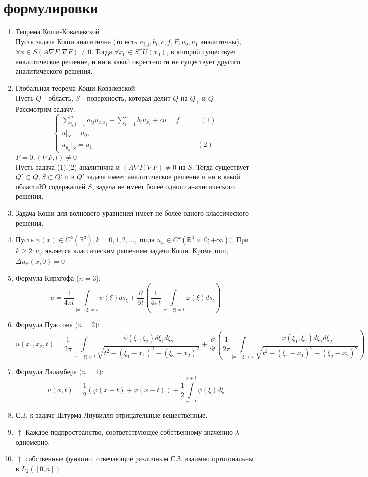 \documentclass[a4paper,12pt]{article}
\newcommand {\pp} {\partial}
\newcommand {\FI} {\varphi}
\newcommand {\iii} {\int\limits}
\newcommand {\LS} {\sum\limits}
\begin{document}
\newpage
\section{формулировки}

\begin{enumerate}
\item Теорема Коши-Ковалевской\\
Пусть задача Коши аналитична (то есть $a_{i,j}, b_i, c, f, F, u_0, u_1$  аналитичны), $\forall x \in S (A\nabla F, \nabla F) \ne 0$. Тогда $\forall x_0\in S \exists U(x_0)$, в которой существует аналитическое решение, и ни в какой окрестности не существует другого аналитического решения.


\item Глобальная теорема Коши-Ковалевской\\
Пусть $Q$ - область, $S$ - поверхность, которая делит $Q$ на $Q_+$ и $Q_-$ Рассмотрим задачу:\\
\begin{equation*}
 \begin{cases}
   \LS_{i,j=1}^n a_{ij} u_{x_ix_j} + \LS_{i=1}^n b_i u_{x_i}+cu=f \quad\quad\quad(1)
   \\
	u|_S = u_0,
	\\
	u_{y_n}|_S = {{u_1}}\quad\quad\quad\quad\quad\quad\quad\quad\quad\quad\quad\quad\quad\quad\quad(2)
\end{cases}
\end{equation*}
$F=0; (\nabla F, l) \ne 0$\\
Пусть задача (1),(2) аналитична и $(A\nabla F,\nabla F) \ne 0$ на $S$. Тогда существует $Q'\subset Q, S\subset Q'$ и в $Q'$ задача имеет аналитическое решение и ни в какой областиЮ содержащей $S$, задача не имеет более одного аналитического решения.
\item Задача Коши для волнового уравнения имеет не более одного классического решения.
\item Пусть $\psi(x)\in C^k(\mathbb{R}^3), k = 0, 1, 2,...$, тогда $u_\psi \in C^k(\mathbb{R}^3 \times [0;+\infty))$, При $k \ge2: u_\psi$ является классическим решением задачи Коши. Кроме того, $\Delta u_\psi(x,0) = 0$
\item Формула Кирхгофа ($n=3$):
$$u = \frac{1}{4\pi t}\iii_{|x-\xi|=t}\psi(\xi)ds_\xi + \frac{\pp}{\pp t} \left(  \frac{1}{4\pi t}\iii_{|x-\xi|=t}\FI(\xi)ds_\xi \right)$$
\item Формула Пуассона ($n=2$):
$$u(x_1,x_2,t) = \frac{1}{2\pi}\iii_{|x-\xi|<t}\frac{\psi(\xi_1,\xi_2)d\xi_1d\xi_2}{\sqrt{t^2 - (\xi_1 - x_1)^2 - (\xi_2-x_2)^2}} + \frac{\pp}{\pp t} \left( \frac{1}{2\pi}\iii_{|x-\xi|<t}\frac{\FI(\xi_1,\xi_2)d\xi_1d\xi_2}{\sqrt{t^2 - (\xi_1 - x_1)^2 - (\xi_2-x_2)^2}} \right)$$
\item Формула Даламбера ($n=1$):
$$u(x,t) = \frac{1}{2}(\FI(x+t) + \FI(x-t)) + \frac{1}{2}\iii_{x-t}^{x+t}\psi(\xi)d\xi$$
\item С.З. к задаче Штурма-Лиувилля отрицательные вещественные.
\item $\uparrow$ Каждое подпространство, соответствующее собственному значению $\lambda$ одномерно.
\item $\uparrow$ собственные функции, отвечающие различным С.З. взаимно ортогональны в $L_2([0,a])$


\end{enumerate}
\end{document}
